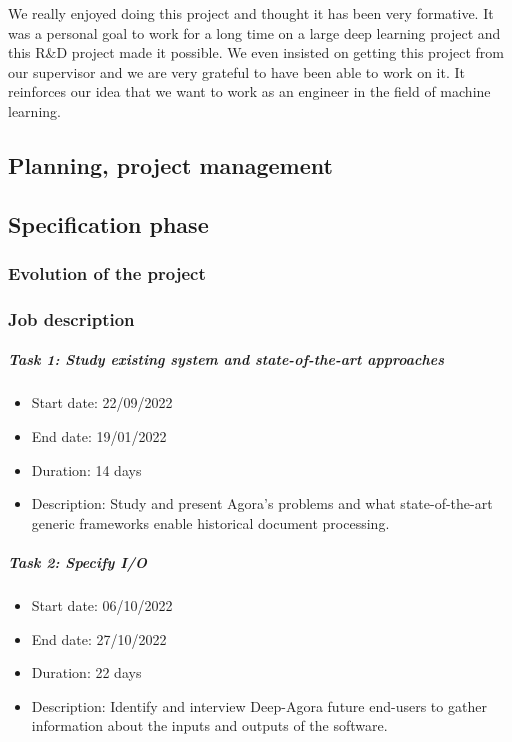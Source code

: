 \documentclass{polytech/polytech}
\numberwithin{figure}{chapter}
\begin{document}
We really enjoyed doing this project and thought it has been very formative.
It was a personal goal to work for a long time on a large deep learning project and this R\&D project made it possible.
We even insisted on getting this project from our supervisor and we are very grateful to have been able to work on it.
It reinforces our idea that we want to work as an engineer in the field of machine learning.

\begin{appendix}



\chapter{Planning, project management}

\section{Specification phase}

\subsection{Evolution of the project}

\label{planSpecs}

\subsection{Job description}

\paragraph{Task 1: Study existing system and state-of-the-art approaches}
\begin{itemize}
    \item Start date: 22/09/2022
    \item End date: 19/01/2022
    \item Duration: 14 days
    \item
        Description: Study and present Agora's problems and what state-of-the-art generic frameworks enable historical document processing.
\end{itemize}

\paragraph{Task 2: Specify I/O}
\begin{itemize}
    \item Start date: 06/10/2022
    \item End date: 27/10/2022
    \item Duration: 22 days
    \item
        Description: Identify and interview Deep-Agora future end-users to gather information about the inputs and outputs of the software.
\end{itemize}


\end{appendix}
\end{document}

